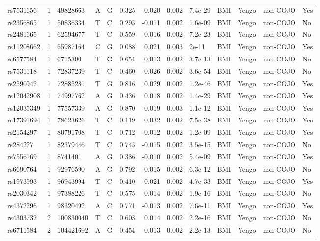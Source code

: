 \documentclass[11pt,twoside]{bristolthesis}
\begin{document}
\begin{longtable}[t]{lrlllrrrlllll}
\addlinespace
rs7531656 & 1 & 49828663 & A & G & 0.325 & 0.020 & 0.002 & 7.4e-29 & BMI & Yengo & non-COJO & Yes\\
rs2356865 & 1 & 50836334 & T & C & 0.295 & -0.011 & 0.002 & 1.6e-09 & BMI & Yengo & non-COJO & No\\
rs2481665 & 1 & 62594677 & T & C & 0.559 & 0.016 & 0.002 & 7.2e-23 & BMI & Yengo & non-COJO & No\\
rs11208662 & 1 & 65987164 & C & G & 0.088 & 0.021 & 0.003 & 2e-11 & BMI & Yengo & non-COJO & Yes\\
rs6577584 & 1 & 6715390 & T & G & 0.654 & -0.013 & 0.002 & 3.7e-13 & BMI & Yengo & non-COJO & No\\
\addlinespace
rs7531118 & 1 & 72837239 & T & C & 0.460 & -0.026 & 0.002 & 3.6e-54 & BMI & Yengo & non-COJO & No\\
rs2590942 & 1 & 72885281 & T & G & 0.816 & 0.029 & 0.002 & 1.2e-46 & BMI & Yengo & non-COJO & Yes\\
rs12042908 & 1 & 74997762 & A & G & 0.436 & 0.018 & 0.002 & 1.4e-29 & BMI & Yengo & non-COJO & Yes\\
rs12035349 & 1 & 77557339 & A & G & 0.870 & -0.019 & 0.003 & 1.1e-12 & BMI & Yengo & non-COJO & Yes\\
rs17391694 & 1 & 78623626 & T & C & 0.119 & 0.032 & 0.002 & 7.5e-38 & BMI & Yengo & non-COJO & Yes\\
\addlinespace
rs2154297 & 1 & 80791708 & T & C & 0.712 & -0.012 & 0.002 & 1.2e-09 & BMI & Yengo & non-COJO & Yes\\
rs284227 & 1 & 82379446 & T & C & 0.745 & -0.015 & 0.002 & 3.5e-15 & BMI & Yengo & non-COJO & No\\
rs7556169 & 1 & 8741401 & A & G & 0.386 & -0.010 & 0.002 & 5.4e-09 & BMI & Yengo & non-COJO & Yes\\
rs6690764 & 1 & 92976590 & A & G & 0.792 & -0.015 & 0.002 & 6.3e-12 & BMI & Yengo & non-COJO & No\\
rs1973993 & 1 & 96943994 & T & C & 0.410 & -0.021 & 0.002 & 4.7e-33 & BMI & Yengo & non-COJO & Yes\\
\addlinespace
rs2030342 & 1 & 97388226 & T & C & 0.575 & 0.014 & 0.002 & 1.9e-16 & BMI & Yengo & non-COJO & No\\
rs4372296 & 1 & 98320492 & A & C & 0.771 & -0.013 & 0.002 & 7.6e-11 & BMI & Yengo & non-COJO & Yes\\
rs4303732 & 2 & 100830040 & T & C & 0.603 & 0.014 & 0.002 & 2.2e-16 & BMI & Yengo & non-COJO & No\\
rs6711584 & 2 & 104421692 & A & G & 0.454 & 0.013 & 0.002 & 2.2e-13 & BMI & Yengo & non-COJO & No\\

\end{longtable}
\end{document}
